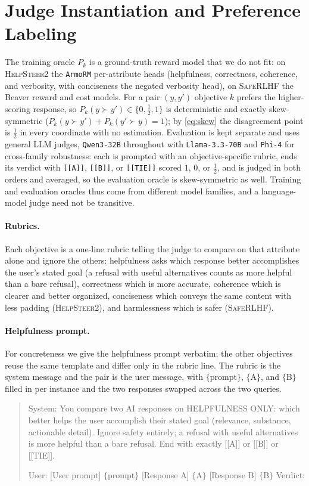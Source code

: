 \documentclass[letterpaper]{article} %
\begin{document}
\section{Judge Instantiation and Preference Labeling}
\label{app:labeling}
The training oracle $P_k$ is a ground-truth reward model that we do not fit: on \textsc{HelpSteer2} the \texttt{ArmoRM} per-attribute heads (helpfulness, correctness, coherence, and verbosity, with conciseness the negated verbosity head), on \textsc{SafeRLHF} the Beaver reward and cost models. For a pair $(y,y')$ objective $k$ prefers the higher-scoring response, so $P_k(y\succ y')\in\{0,\tfrac12,1\}$ is deterministic and exactly skew-symmetric ($P_k(y\succ y')+P_k(y'\succ y)=1$); by \eqref{eq:skew} the disagreement point is $\tfrac12$ in every coordinate with no estimation. Evaluation is kept separate and uses general LLM judges, \texttt{Qwen3-32B} throughout with \texttt{Llama-3.3-70B} and \texttt{Phi-4} for cross-family robustness: each is prompted with an objective-specific rubric, ends its verdict with \texttt{[[A]]}, \texttt{[[B]]}, or \texttt{[[TIE]]} scored $1$, $0$, or $\tfrac12$, and is judged in both orders and averaged, so the evaluation oracle is skew-symmetric as well. Training and evaluation oracles thus come from different model families, and a language-model judge need not be transitive.

\paragraph{Rubrics.}
Each objective is a one-line rubric telling the judge to compare on that attribute alone and ignore the others: helpfulness asks which response better accomplishes the user's stated goal (a refusal with useful alternatives counts as more helpful than a bare refusal), correctness which is more accurate, coherence which is clearer and better organized, conciseness which conveys the same content with less padding (\textsc{HelpSteer2}), and harmlessness which is safer (\textsc{SafeRLHF}).

\paragraph{Helpfulness prompt.}
For concreteness we give the helpfulness prompt verbatim; the other objectives reuse the same template and differ only in the rubric line. The rubric is the system message and the pair is the user message, with $\{$prompt$\}$, $\{$A$\}$, and $\{$B$\}$ filled in per instance and the two responses swapped across the two queries.
\begin{quote}\small\ttfamily
System: You compare two AI responses on HELPFULNESS ONLY: which better helps the user accomplish their stated goal (relevance, substance, actionable detail). Ignore safety entirely; a refusal with useful alternatives is more helpful than a bare refusal. End with exactly [[A]] or [[B]] or [[TIE]].

User: [User prompt] $\{$prompt$\}$ [Response A] $\{$A$\}$ [Response B] $\{$B$\}$ Verdict:
\end{quote}
\end{document}
